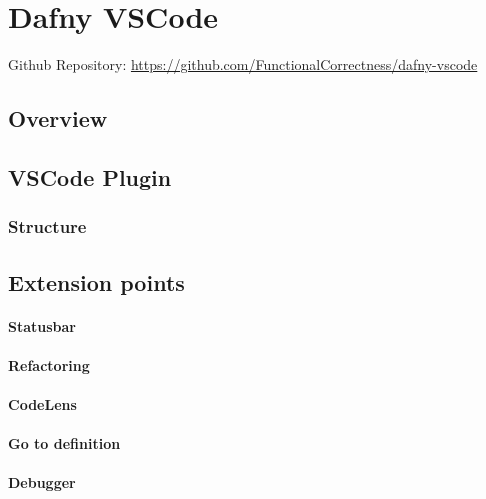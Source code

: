 \section{Dafny VSCode}
Github Repository: \href{https://github.com/FunctionalCorrectness/dafny-vscode}{https://github.com/FunctionalCorrectness/dafny-vscode}

\subsection{Overview}

\subsection{VSCode Plugin}
\subsubsection{Structure}




\subsection{Extension points}

\paragraph{Statusbar}

\paragraph{Refactoring}

\paragraph{CodeLens}

\paragraph{Go to definition}

\paragraph{Debugger}

